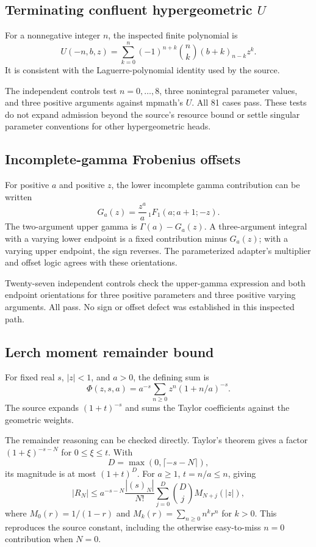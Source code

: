 \documentclass[11pt,a4paper]{article}
\begin{document}
\subsection{Terminating confluent hypergeometric $U$}

For a nonnegative integer $n$, the inspected finite polynomial is
\[
U(-n,b,z)=\sum_{k=0}^{n}(-1)^{n+k}\binom nk(b+k)_{n-k}z^k.
\]
It is consistent with the Laguerre-polynomial identity used by the source.\cite{identities,dlmfhyper}

The independent controls test $n=0,\ldots,8$, three nonintegral parameter values, and three positive arguments against mpmath's $U$. All 81 cases pass. These tests do not expand admission beyond the source's resource bound or settle singular parameter conventions for other hypergeometric heads.

\subsection{Incomplete-gamma Frobenius offsets}

For positive $a$ and positive $z$, the lower incomplete gamma contribution can be written
\[
G_a(z)=\frac{z^a}{a}\,{}_1F_1(a;a+1;-z).
\]
The two-argument upper gamma is $\Gamma(a)-G_a(z)$. A three-argument integral with a varying lower endpoint is a fixed contribution minus $G_a(z)$; with a varying upper endpoint, the sign reverses. The parameterized adapter's multiplier and offset logic agrees with these orientations.\cite{parameterized,dlmfgamma}

Twenty-seven independent controls check the upper-gamma expression and both endpoint orientations for three positive parameters and three positive varying arguments. All pass. No sign or offset defect was established in this inspected path.

\subsection{Lerch moment remainder bound}

For fixed real $s$, $|z|<1$, and $a>0$, the defining sum is
\[
\Phi(z,s,a)=a^{-s}\sum_{n\ge0}z^n(1+n/a)^{-s}.
\]
The source expands $(1+t)^{-s}$ and sums the Taylor coefficients against the geometric weights.\cite{dirichlet,dlmflerch}

The remainder reasoning can be checked directly. Taylor's theorem gives a factor $(1+\xi)^{-s-N}$ for $0\le\xi\le t$. With
\[
D=\max(0,\lceil-s-N\rceil),
\]
its magnitude is at most $(1+t)^D$. For $a\ge1$, $t=n/a\le n$, giving
\[
|R_N|\le a^{-s-N}\frac{|(s)_N|}{N!}
\sum_{j=0}^{D}\binom Dj M_{N+j}(|z|),
\]
where $M_0(r)=1/(1-r)$ and $M_k(r)=\sum_{n\ge0}n^kr^n$ for $k>0$. This reproduces the source constant, including the otherwise easy-to-miss $n=0$ contribution when $N=0$.
\end{document}

